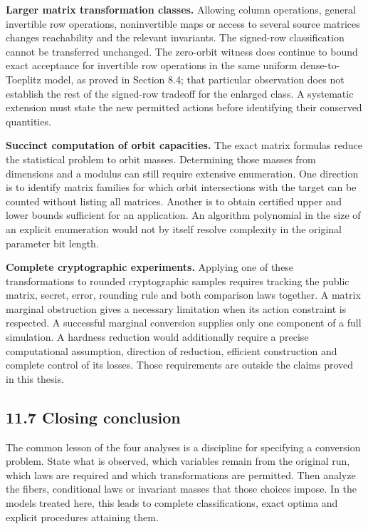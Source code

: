 \documentclass[
]{article}
\begin{document}
\textbf{Larger matrix transformation classes.} Allowing column
operations, general invertible row operations, noninvertible maps or
access to several source matrices changes reachability and the relevant
invariants. The signed-row classification cannot be transferred
unchanged. The zero-orbit witness does continue to bound exact
acceptance for invertible row operations in the same uniform
dense-to-Toeplitz model, as proved in Section 8.4; that particular
observation does not establish the rest of the signed-row tradeoff for
the enlarged class. A systematic extension must state the new permitted
actions before identifying their conserved quantities.

\textbf{Succinct computation of orbit capacities.} The exact matrix
formulas reduce the statistical problem to orbit masses. Determining
those masses from dimensions and a modulus can still require extensive
enumeration. One direction is to identify matrix families for which
orbit intersections with the target can be counted without listing all
matrices. Another is to obtain certified upper and lower bounds
sufficient for an application. An algorithm polynomial in the size of an
explicit enumeration would not by itself resolve complexity in the
original parameter bit length.

\textbf{Complete cryptographic experiments.} Applying one of these
transformations to rounded cryptographic samples requires tracking the
public matrix, secret, error, rounding rule and both comparison laws
together. A matrix marginal obstruction gives a necessary limitation
when its action constraint is respected. A successful marginal
conversion supplies only one component of a full simulation. A hardness
reduction would additionally require a precise computational assumption,
direction of reduction, efficient construction and complete control of
its losses. Those requirements are outside the claims proved in this
thesis.

\subsection{11.7 Closing conclusion}\label{closing-conclusion}

The common lesson of the four analyses is a discipline for specifying a
conversion problem. State what is observed, which variables remain from
the original run, which laws are required and which transformations are
permitted. Then analyze the fibers, conditional laws or invariant masses
that those choices impose. In the models treated here, this leads to
complete classifications, exact optima and explicit procedures attaining
them.
\end{document}

